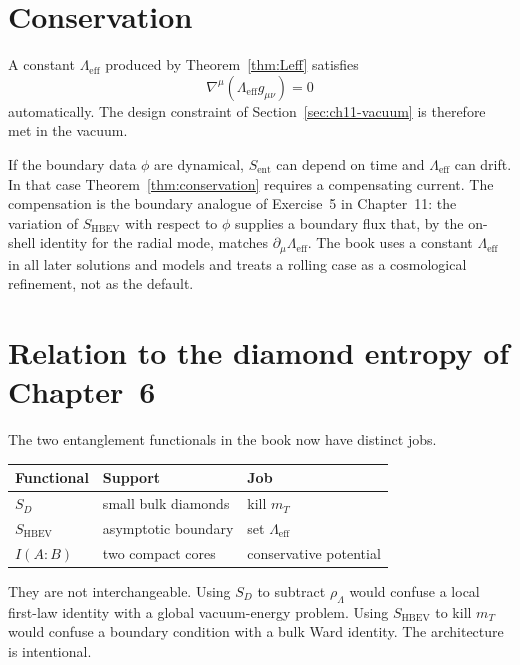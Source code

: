 \section{Conservation}
\label{sec:ch12-cons}

A constant \(\Lambda_{\mathrm{eff}}\) produced by
Theorem~\ref{thm:Leff} satisfies
\begin{equation}
  \label{eq:Leff-cons}
  \nabla^\mu(\Lambda_{\mathrm{eff}}g_{\mu\nu})=0
\end{equation}
automatically. The design constraint of
Section~\ref{sec:ch11-vacuum} is therefore met in the vacuum.

If the boundary data \(\phi\) are dynamical, \(S_{\mathrm{ent}}\)
can depend on time and \(\Lambda_{\mathrm{eff}}\) can drift. In
that case Theorem~\ref{thm:conservation} requires a compensating
current. The compensation is the boundary analogue of
Exercise~5 in Chapter~11: the variation of \(S_{\mathrm{HBEV}}\)
with respect to \(\phi\) supplies a boundary flux that, by the
on-shell identity for the radial mode, matches
\(\partial_\mu\Lambda_{\mathrm{eff}}\). The book uses a constant
\(\Lambda_{\mathrm{eff}}\) in all later solutions and models and treats
a rolling case as a cosmological refinement, not as the default.

\section{Relation to the diamond entropy of Chapter~6}
\label{sec:ch12-diamonds}

The two entanglement functionals in the book now have distinct
jobs.

\begin{center}
\begin{tabular}{@{}lll@{}}
\toprule
Functional & Support & Job \\
\midrule
\(S_D\) & small bulk diamonds & kill \(m_T\) \\
\(S_{\mathrm{HBEV}}\) & asymptotic boundary & set \(\Lambda_{\mathrm{eff}}\) \\
\(I(A:B)\) & two compact cores & conservative potential \\
\bottomrule
\end{tabular}
\end{center}

They are not interchangeable. Using \(S_D\) to subtract
\(\rho_\Lambda\) would confuse a local first-law identity with a
global vacuum-energy problem. Using \(S_{\mathrm{HBEV}}\) to kill
\(m_T\) would confuse a boundary condition with a bulk Ward
identity. The architecture is intentional.

